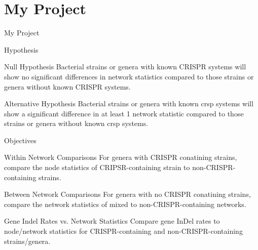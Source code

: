 \documentclass[dvipsnames]{beamer}
\begin{document}
\section{My Project}
\begin{frame}[fragile]{}
    \begin{center}
        \Huge \textcolor{OliveGreen}{My Project}
    \end{center}
\end{frame}
\begin{frame}[fragile]{Hypothesis}
     \begin{block}{Null Hypothesis}
     Bacterial strains or genera with known CRISPR systems will show no significant differences in network statistics compared to those strains or genera without known CRISPR systems.
    \end{block}
     \begin{block}{Alternative Hypothesis}
     Bacterial strains or genera with known \ac{crsp} systems will show a significant difference in at least 1 network statistic compared to those strains or  genera without known \ac{crsp} systems.
    \end{block}
\end{frame}
\begin{frame}[fragile]{Objectives}
     \begin{block}{Within Network Comparisons}
        For genera with CRISPR conatining strains, compare the node statistics of CRIPSR-containing strain to non-CRISPR-containing strains.
    \end{block}
     \begin{block}{Between Network Comparisons}
        For genera with no CRISPR conatining strains, compare the network statistics of mixed to non-CRISPR-containing networks.
    \end{block}
     \begin{block}{Gene Indel Rates vs. Network Statistics}
        Compare gene InDel rates to node/network statistics for CRISPR-containing and non-CRISPR-containing strains/genera.
    \end{block}
\end{frame}
\end{document}
